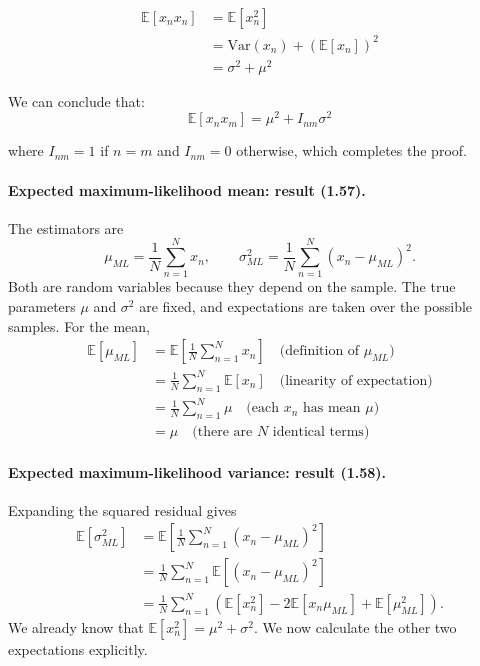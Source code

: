 \documentclass{article}
\begin{document}
\begin{tcolorbox}[breakable,colback=gray!5,colframe=gray!60,title=Solution]
\begin{align*}
\mathbb{E}[x_n x_n]
&= \mathbb{E}[x_n^2] \\
&= \text{Var}(x_n) + (\mathbb{E}[x_n])^2 \\
&= \sigma^2 + \mu^2
\end{align*}


We can conclude that:
\[
\mathbb{E}[x_n x_m] = \mu^2 + I_{nm} \sigma^2
\]

where $I_{nm} = 1$ if $n = m$ and $I_{nm} = 0$ otherwise, which completes the proof.

\paragraph{Expected maximum-likelihood mean: result (1.57).}
The estimators are
\[
\mu_{ML}=\frac{1}{N}\sum_{n=1}^{N}x_n,
\qquad
\sigma^2_{ML}=\frac{1}{N}\sum_{n=1}^{N}(x_n-\mu_{ML})^2.
\]
Both are random variables because they depend on the sample. The true
parameters $\mu$ and $\sigma^2$ are fixed, and expectations are taken over
the possible samples. For the mean,
\begin{align*}
\mathbb{E}[\mu_{ML}] &= \mathbb{E}\left[\frac{1}{N} \sum_{n=1}^{N} x_n\right] \quad \text{(definition of $\mu_{ML}$)} \\
&= \frac{1}{N} \sum_{n=1}^{N} \mathbb{E}[x_n] \quad \text{(linearity of expectation)} \\
&= \frac{1}{N} \sum_{n=1}^{N} \mu \quad \text{(each $x_n$ has mean $\mu$)} \\
&= \mu \quad \text{(there are $N$ identical terms)}
\end{align*}

\paragraph{Expected maximum-likelihood variance: result (1.58).}
Expanding the squared residual gives
\begin{align*}
\mathbb{E}[\sigma^2_{ML}]
&=\mathbb{E}\left[\frac{1}{N}\sum_{n=1}^{N}(x_n-\mu_{ML})^2\right] \\
&=\frac{1}{N}\sum_{n=1}^{N}\mathbb{E}[(x_n-\mu_{ML})^2] \\
&=\frac{1}{N}\sum_{n=1}^{N}
\left(\mathbb{E}[x_n^2]-2\mathbb{E}[x_n\mu_{ML}]
+\mathbb{E}[\mu_{ML}^2]\right).
\end{align*}
We already know that $\mathbb{E}[x_n^2]=\mu^2+\sigma^2$.
We now calculate the other two expectations explicitly.


\end{tcolorbox}
\end{document}
